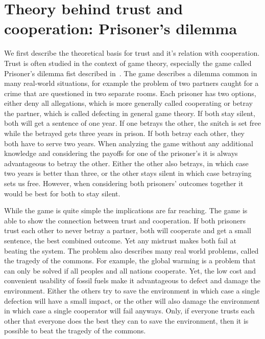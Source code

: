 \section{Theory behind trust and cooperation: Prisoner's dilemma}
We first describe the theoretical basis for trust and it's relation with cooperation. Trust is often
studied in the context of game theory, especially the game called Prisoner's dilemma fist described
in~\cite{chammah1965prisoner}. The game describes a dilemma common in many real-world situations, for
example the problem of two partners caught for a crime that are questioned in two separate rooms. 
Each prisoner has two options, either deny all allegations, which is more generally called cooperating
 or betray the partner, which is called defecting in general game theory. If both stay 
silent, both will get a sentence of one year. If one betrays the other, the snitch is set free while the 
betrayed gets three years in prison. If both betray each other, they both have to serve two years.
When analyzing the game without any additional knowledge and considering the payoffs for one of the
prisoner's it is always advantageous to betray the other. Either the other also betrays, in which case
two years is better than three, or the other stays silent in which case betraying sets us free. 
However, when considering both prisoners' outcomes together it would be best for both to stay silent.


While the game is quite simple the implications are far reaching. The game is able to show the 
connection between trust and cooperation. If both prisoners trust each other to never betray a 
partner, both will cooperate and get a small sentence, the best combined outcome. Yet any mistrust
makes both fail at beating the system. The problem also describes many real world problems, called 
the tragedy of the commons. For example, the global warming is a problem that can only be solved if
all peoples and all nations cooperate. Yet, the low cost and convenient usability of fossil fuels 
make it advantageous to defect and damage the environment. Either the others try to save the environment
in which case a single defection will have a small impact, or the other will also damage the environment
in which case a single cooperator will fail anyways. Only, if everyone trusts each other that
everyone does the best they can to save the environment, then it is possible to beat the tragedy 
of the commons.

